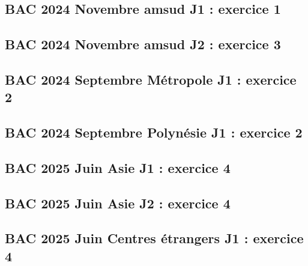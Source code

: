 \documentclass[lang=fr,edition=teacher,layout=sheet]{mxbook}
\begin{document}
\begingroup\endgroup
\par\bigskip
{}\subsection*{BAC 2024 Novembre amsud J1 : exercice 1}
\begingroup\endgroup
\par\bigskip
{}\subsection*{BAC 2024 Novembre amsud J2 : exercice 3}
\begingroup\endgroup
\par\bigskip
{}\subsection*{BAC 2024 Septembre Métropole J1 : exercice 2}
\begingroup\endgroup
\par\bigskip
{}\subsection*{BAC 2024 Septembre Polynésie J1 : exercice 2}
\begingroup\endgroup
\par\bigskip
{}\subsection*{BAC 2025 Juin Asie J1 : exercice 4}
\begingroup\endgroup
\par\bigskip
{}\subsection*{BAC 2025 Juin Asie J2 : exercice 4}
\begingroup\endgroup
\par\bigskip
{}\subsection*{BAC 2025 Juin Centres étrangers J1 : exercice 4}
\end{document}
